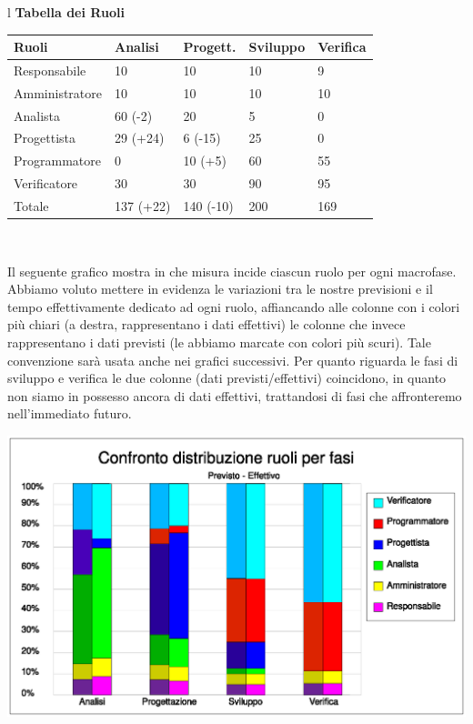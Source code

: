 \documentclass[11pt,titlepage,a4paper]{report}
\begin{document}
\begin{table}[hbtp]
\large{
\begin{tabular}{l}
\Large{\textbf{\textsf{Tabella dei Ruoli}}} \\
\begin{tabular}{||p{3cm}||p{1.5cm}||p{1.5cm}||p{2cm}||p{1.5cm}||}
\hline 
\textbf{Ruoli} & \textbf{Analisi} & \textbf{Progett.} & \textbf{Sviluppo} & \textbf{Verifica}\\
\hline

{Responsabile}&10&10&10&9 \\ 
\hline 
{Amministratore} &10&10&10&10\\ 
\hline
{Analista}& 60 \footnotesize{(-2)}&20&5&0 \\
\hline
{Progettista}&29 \footnotesize{(+24)}&6 \footnotesize{(-15)}&25&0 \\
\hline
{Programmatore}&0&10 \footnotesize{(+5)}&60&55 \\
\hline
{Verificatore}& 30&30&90&95 \\
\hline
{Totale}& 137 \footnotesize{(+22)}&140 \footnotesize{(-10)}&200&169 \\
\hline
\end{tabular} \\

\end{tabular}
}

\end{table}

Il seguente grafico mostra in che misura incide ciascun ruolo per ogni macrofase. Abbiamo voluto mettere in evidenza le variazioni tra le nostre previsioni e il tempo effettivamente dedicato ad ogni ruolo, affiancando alle colonne con i colori pi\`u chiari (a destra, rappresentano i dati effettivi) le colonne che invece rappresentano i dati previsti (le abbiamo marcate con colori pi\`u scuri). Tale convenzione sar\`a usata anche nei grafici successivi. Per quanto riguarda le fasi di sviluppo e verifica le due colonne (dati previsti/effettivi) coincidono, in quanto non siamo in possesso ancora di dati effettivi, trattandosi di fasi che affronteremo nell'immediato futuro.

\begin{center}
\includegraphics [width=1\textwidth] {confronto-ruoli-fasi.eps}
\end{center}
\end{document}

